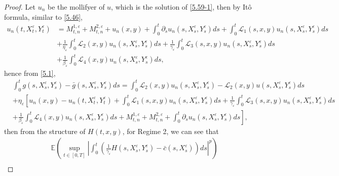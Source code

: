 \documentclass[11pt,reqno]{amsart}
\numberwithin{equation}{section}
\begin{document}
\begin{proof}
Let $u_{n}$ be the mollifyer of $u$, which is the solution of \eqref{5.59-1}, then by It\^{o} formula, similar to \eqref{5.46},
\begin{equation}\label{5.63}
	\begin{split}
		u_{n}(t,X_{t}^{\varepsilon},Y_{t}^{\varepsilon})
		&=M_{t,n}^{1,\varepsilon}+M_{t,n}^{2,\varepsilon}+u_{n}(x,y)+\int_{0}^{t}\partial_{s}u_{n}(s,X_{s}^{\varepsilon},Y_{s}^{\varepsilon})ds+\int_{0}^{t}\mathcal{L}_{1}(s,x,y)u_{n}(s,X_{s}^{\varepsilon},Y_{s}^{\varepsilon})ds\\
		&+\frac{1}{\eta_{\varepsilon}}\int_{0}^{t}\mathcal{L}_{2}(x,y)u_{n}(s,X_{s}^{\varepsilon},Y_{s}^{\varepsilon})ds+\frac{1}{\gamma_{\varepsilon}}\int_{0}^{t}\mathcal{L}_{3}(s,x,y)u_{n}(s,X_{s}^{\varepsilon},Y_{s}^{\varepsilon})ds\\
		&+\frac{1}{\beta_{\varepsilon}}\int_{0}^{t}\mathcal{L}_{4}(x,y)u_{n}(s,X_{s}^{\varepsilon},Y_{s}^{\varepsilon})ds,
	\end{split}
\end{equation}
hence from \eqref{5.1},
\begin{equation}\label{5.64}
	\begin{split}
		&\int_{0}^{t} g(s,X_{s}^{\varepsilon},Y_{s}^{\varepsilon})-\bar{g}(s,X_{s}^{\varepsilon},Y_{s}^{\varepsilon})ds=\int_{0}^{t} \mathcal{L}_{2}(x,y)u_{n}(s,X_{s}^{\varepsilon},Y_{s}^{\varepsilon})- \mathcal{L}_{2}(x,y)u(s,X_{s}^{\varepsilon},Y_{s}^{\varepsilon})ds\\
		&+\eta_{\varepsilon}\left[ u_{n}(x,y)-u_{n}(t,X_{t}^{\varepsilon},Y_{t}^{\varepsilon})+\int_{0}^{t}\mathcal{L}_{1}(s,x,y)u_{n}(s,X_{s}^{\varepsilon},Y_{s}^{\varepsilon})ds+\frac{1}{\gamma_{\varepsilon}}\int_{0}^{t}\mathcal{L}_{3}(s,x,y)u_{n}(s,X_{s}^{\varepsilon},Y_{s}^{\varepsilon})ds\right.	\\
		&\left. +\frac{1}{\beta_{\varepsilon}}\int_{0}^{t}\mathcal{L}_{4}(x,y)u_{n}(s,X_{s}^{\varepsilon},Y_{s}^{\varepsilon})ds +M_{t,n}^{1,\varepsilon}+M_{t,n}^{2,\varepsilon}+\int_{0}^{t} \partial_{s}u_{n}(s,X_{s}^{\varepsilon},Y_{s}^{\varepsilon}) ds\right],
	\end{split}
\end{equation}
then  from the structure of $H(t,x,y)$, for Regime 2,  we can see that
\begin{align}
		&\mathbb{E}\left( \sup_{t\in [0,T]}\left| \int_{0}^{t} \left( \frac{1}{\gamma_{\varepsilon}}H(s,X_{s}^{\varepsilon},Y_{s}^{\varepsilon})- \bar{c}(s,X_{s}^{\varepsilon})\right) ds\right|^{p} \right)\nonumber \\

\end{align}
\end{proof}
\end{document}
